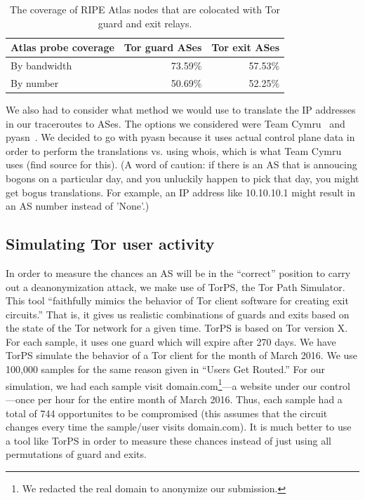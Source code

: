 

\begin{table}[t]
	\centering
	\begin{tabular}{l|r r}
	\toprule
	\textbf{Atlas probe coverage} & \textbf{Tor guard ASes} & \textbf{Tor exit ASes} \\
	\midrule
	By bandwidth & 73.59\% & 57.53\% \\
	By number & 50.69\% & 52.25\% \\
	\bottomrule
	\end{tabular}
	\caption{The coverage of RIPE Atlas nodes that are colocated with Tor guard and exit
	relays.}
	\label{tab:atlas-coverage}
\end{table}

We also had to consider what method we would use to translate the IP addresses in
our traceroutes to ASes. The options we considered were Team Cymru~\cite{ipasn}
and pyasn~\cite{pyasn}. We decided to go with pyasn because it uses actual
control plane data in order to perform the translations vs. using whois, which
is what Team Cymru uses (find source for this).  (A word of caution: if there is
an AS that is annoucing bogons on a particular day, and you unluckily happen to
pick that day, you might get bogus translations. For example, an IP address like
10.10.10.1 might result in an AS number instead of 'None'.)

\subsection{Simulating Tor user activity}
In order to measure the chances an AS will be in the ``correct'' position to carry out a
deanonymization attack, we make use of TorPS, the Tor Path Simulator. This tool 
``faithfully mimics the behavior of Tor client software for creating exit circuits.''
That is, it gives us realistic combinations of guards and exits based on the state of the 
Tor network for a given time. TorPS is based on Tor version X. For each sample, it uses 
one guard which will expire after 270 days. We have TorPS simulate the behavior of a Tor 
client for the month of March 2016. We use 100,000 samples for the same reason given in
``Users Get Routed.''  For our simulation, we had each sample 
visit domain.com\footnote{We redacted the real domain to anonymize our
submission.}---a website under our control---once per hour for the entire month
of March 2016.  Thus, each sample had a total of 744 opportunites to be
compromised (this assumes that the circuit changes every time the sample/user
visits domain.com).  It is much better to use a tool like TorPS in order to
measure these chances instead of just using all permutations of guard and exits.

